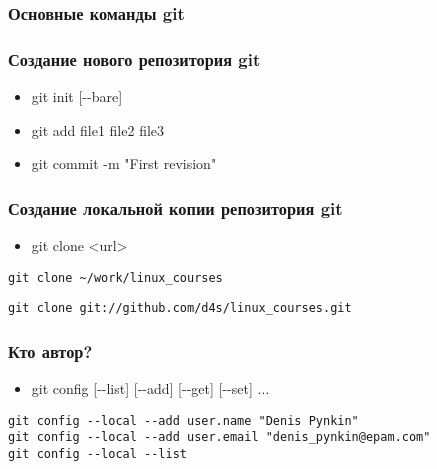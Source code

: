 \begin{frame}
 \frametitle{Основные команды git}
\end{frame}

\begin{frame}
	\frametitle{Создание нового репозитория git}
	\begin{itemize}
		\item git init [-{}-bare]
		\item git add file1 file2 file3
		\item git commit -m "First revision"
	\end{itemize}
\end{frame}

\begin{frame}[fragile]
	\frametitle{Создание локальной копии репозитория git}
	\begin{itemize}
		\item git clone <url> 
	\end{itemize}

	\begin{verbatim}
git clone ~/work/linux_courses 
	\end{verbatim}

	\begin{verbatim}
git clone git://github.com/d4s/linux_courses.git
	\end{verbatim}

\end{frame}

\begin{frame}[fragile]
	\frametitle{Кто автор?}
	\begin{itemize}
		\item git config [-{}-list] [-{}-add] [-{}-get] [-{}-set] $\dots$
	\end{itemize}

	\begin{verbatim}
git config --local --add user.name "Denis Pynkin"
git config --local --add user.email "denis_pynkin@epam.com"
git config --local --list
	\end{verbatim}

\end{frame}


